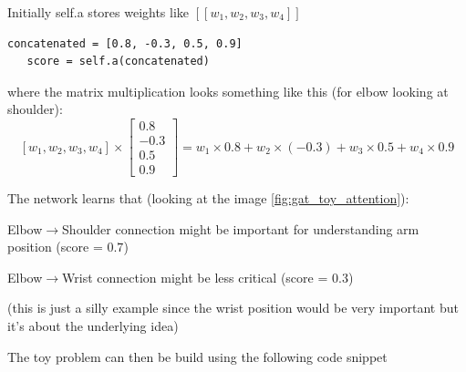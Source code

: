Initially self.a stores weights like $[[w_1,w_2,w_3,w_4]]$

\begin{lstlisting}[style=pythonstyle,title={Calculating score from concatenated vector},label={code:toy_gat_score}]
   concatenated = [0.8, -0.3, 0.5, 0.9]
   score = self.a(concatenated)
\end{lstlisting}

where the matrix multiplication looks something like this (for elbow looking at shoulder):
\begin{equation}
\label{eq:gat_toy_attention_score}
[w_1, w_2, w_3, w_4] \times 
\begin{bmatrix}
0.8 \\
-0.3 \\
0.5 \\
0.9
\end{bmatrix}
= w_1 \times 0.8 + w_2 \times (-0.3) + w_3 \times 0.5 + w_4 \times 0.9
\end{equation}

The network learns that (looking at the image \ref{fig:gat_toy_attention}):
\begin{compactitem}
    \item Elbow$\rightarrow$Shoulder connection might be important for understanding arm position (score = $0.7$)
    \item Elbow$\rightarrow$Wrist connection might be less critical (score = $0.3$)
\end{compactitem}

(this is just a silly example since the wrist position would be very important but it's about the underlying idea)

The toy problem can then be build using the following code snippet

